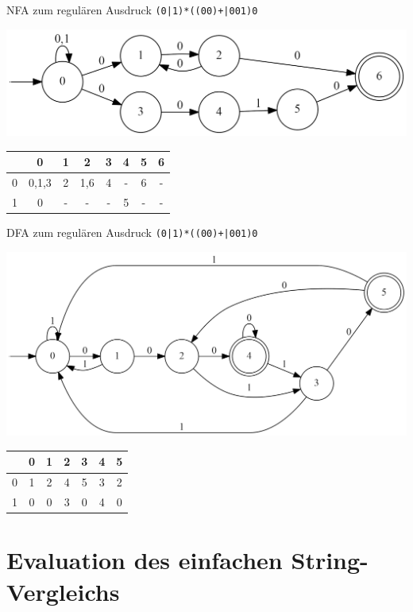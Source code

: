 \documentclass{beamer}
\begin{document}
	\begin{frame}{NFA zum regulären Ausdruck \texttt{(0|1)*((00)+|001)0}}
		\centering 
		
		\includegraphics[width=\textwidth]{./nfa_beispiel.png}
		
		\vfill
		
		\begin{tabular}{ c | c c c c c c c}
			 & 0 & 1 & 2 & 3 & 4 & 5 & 6 \\
			\hline
			0 & 0,1,3 & 2 & 1,6 & 4 & - & 6 & - \\
			1 & 0 & - & - & - & 5 & - & - 
		\end{tabular}
	\end{frame}

	\begin{frame}{DFA zum regulären Ausdruck \texttt{(0|1)*((00)+|001)0}}
		\centering
		
		\includegraphics[width=\textwidth]{./dfa_beispiel.png}
		
		\vfill
		
		\begin{tabular}{c | c c c c c c}
			 & 0 & 1 & 2 & 3 & 4 & 5 \\
			\hline
			0 & 1 & 2 & 4 & 5 & 3 & 2 \\
			1 & 0 & 0 & 3 & 0 & 4 & 0
		\end{tabular}
	\end{frame}

	\section{Evaluation des einfachen String-Vergleichs}
	
\end{document}
